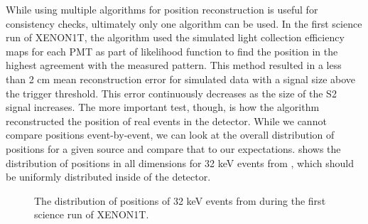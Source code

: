While using multiple algorithms for position reconstruction is useful for consistency checks, ultimately only one algorithm can be used.  In the first science run of XENON1T, the algorithm used the simulated light collection efficiency maps for each PMT as part of likelihood function to find the position in the highest agreement with the measured pattern.  This method resulted in a less than 2 cm mean reconstruction error for simulated data with a signal size above the trigger threshold.  This error continuously decreases as the size of the S2 signal increases.  The more important test, though, is how the algorithm reconstructed the position of real events in the detector.  While we cannot compare positions event-by-event, we can look at the overall distribution of positions for a given source and compare that to our expectations.   shows the distribution of positions in all dimensions for 32 keV events from , which should be uniformly distributed inside of the detector.


\begin{figure}[t]
	\centering
	 \hfill
	\caption{The distribution of positions of 32 keV events from  during the first science run of XENON1T.}
	\label{fig:xe1t_pos_rec_kr}
\end{figure}


